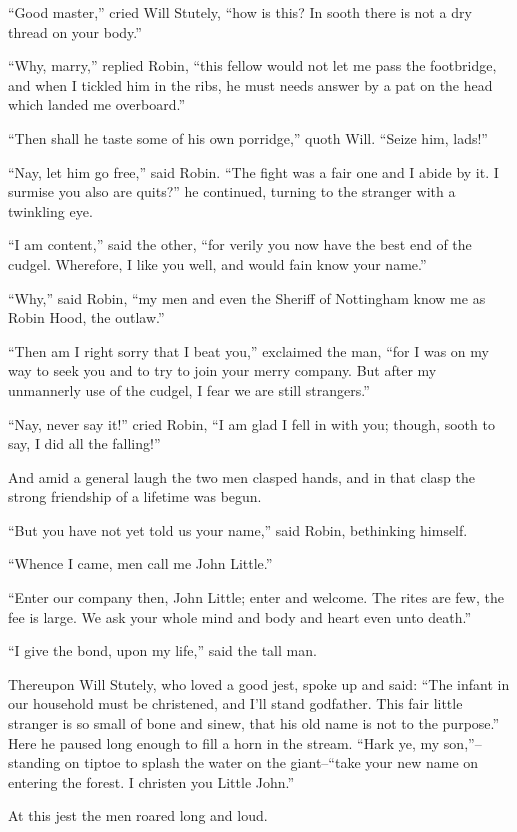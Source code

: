``Good master,'' cried Will Stutely, ``how is this? In sooth there is
not a dry thread on your body.''

``Why, marry,'' replied Robin, ``this fellow would not let me pass the
footbridge, and when I tickled him in the ribs, he must needs answer by
a pat on the head which landed me overboard.''

``Then shall he taste some of his own porridge,'' quoth Will. ``Seize
him, lads!''

``Nay, let him go free,'' said Robin. ``The fight was a fair one and I
abide by it. I surmise you also are quits?'' he continued, turning to
the stranger with a twinkling eye.

``I am content,'' said the other, ``for verily you now have the best end
of the cudgel. Wherefore, I like you well, and would fain know your
name.''

``Why,'' said Robin, ``my men and even the Sheriff of Nottingham know me
as Robin Hood, the outlaw.''

``Then am I right sorry that I beat you,'' exclaimed the man, ``for I
was on my way to seek you and to try to join your merry company. But
after my unmannerly use of the cudgel, I fear we are still strangers.''

``Nay, never say it!'' cried Robin, ``I am glad I fell in with you;
though, sooth to say, I did all the falling!''

And amid a general laugh the two men clasped hands, and in that clasp
the strong friendship of a lifetime was begun.

``But you have not yet told us your name,'' said Robin, bethinking
himself.

``Whence I came, men call me John Little.''

``Enter our company then, John Little; enter and welcome. The rites are
few, the fee is large. We ask your whole mind and body and heart even
unto death.''

``I give the bond, upon my life,'' said the tall man.

Thereupon Will Stutely, who loved a good jest, spoke up and said: ``The
infant in our household must be christened, and I'll stand godfather.
This fair little stranger is so small of bone and sinew, that his old
name is not to the purpose.'' Here he paused long enough to fill a horn
in the stream. ``Hark ye, my son,''--standing on tiptoe to splash the
water on the giant--``take your new name on entering the forest. I
christen you Little John.''

At this jest the men roared long and loud.


